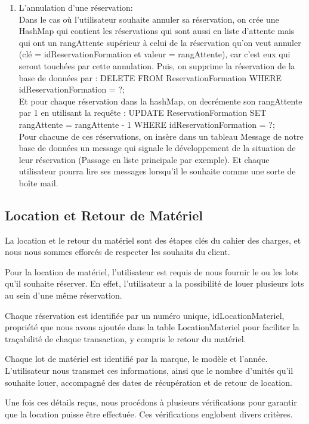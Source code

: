 \begin{enumerate}
    \item L’annulation d’une réservation:\\
Dans le cas où l'utilisateur souhaite annuler sa réservation, on crée une HashMap qui contient les réservations qui sont aussi en liste d'attente mais qui ont un rangAttente supérieur à celui de la réservation qu'on veut annuler (clé = idReservationFormation et valeur = rangAttente), car c'est eux qui seront touchées par cette annulation. Puis, on supprime la réservation de la base de données par : DELETE FROM ReservationFormation WHERE idReservationFormation = ?;\\
Et pour chaque réservation dans la hashMap, on decrémente son rangAttente par 1 en utilisant la requête :
UPDATE ReservationFormation SET rangAttente = rangAttente - 1 WHERE idReservationFormation = ?;\\
Pour chacune de ces réservations, on insère dans un tableau Message de notre base de données un message qui signale le développement de la situation de leur réservation (Passage en liste principale par exemple). Et chaque utilisateur pourra lire ses messages lorsqu'il le souhaite comme une sorte de boîte mail.
\end{enumerate}


\subsection{Location et Retour de Matériel}
La location et le retour du matériel sont des étapes clés du cahier des charges, et nous nous sommes efforcés de respecter les souhaits du client.

Pour la location de matériel, l'utilisateur est requis de nous fournir le ou les lots qu'il souhaite réserver. En effet, l'utilisateur a la possibilité de louer plusieurs lots au sein d'une même réservation.

 Chaque réservation est identifiée par un numéro unique, idLocationMateriel, propriété que nous avons ajoutée dans la table LocationMateriel pour faciliter la traçabilité de chaque transaction, y compris le retour du matériel.


Chaque lot de matériel est identifié par la marque, le modèle et l'année.  L'utilisateur nous transmet ces informations, ainsi que le nombre d'unités qu'il souhaite louer, accompagné des dates de récupération et de retour de location.  

Une fois ces détails reçus, nous procédons à plusieurs vérifications pour garantir que la location puisse être effectuée. Ces vérifications englobent divers critères.

